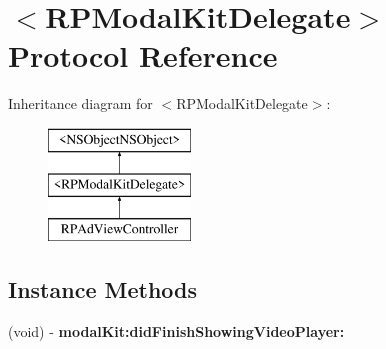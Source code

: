\hypertarget{protocol_r_p_modal_kit_delegate-p}{\section{$<$R\-P\-Modal\-Kit\-Delegate$>$ Protocol Reference}
\label{protocol_r_p_modal_kit_delegate-p}
}
Inheritance diagram for $<$R\-P\-Modal\-Kit\-Delegate$>$\-:\begin{figure}[H]
\begin{center}
\leavevmode
\includegraphics[height=3.000000cm]{protocol_r_p_modal_kit_delegate-p}
\end{center}
\end{figure}
\subsection*{Instance Methods}
\begin{DoxyCompactItemize}
\item 
\hypertarget{protocol_r_p_modal_kit_delegate-p_ae7de5ed0c2bf489a7d2ce7d909fb918a}{(void) -\/ {\bfseries modal\-Kit\-:did\-Finish\-Showing\-Video\-Player\-:}}\label{protocol_r_p_modal_kit_delegate-p_ae7de5ed0c2bf489a7d2ce7d909fb918a}

\end{DoxyCompactItemize}
